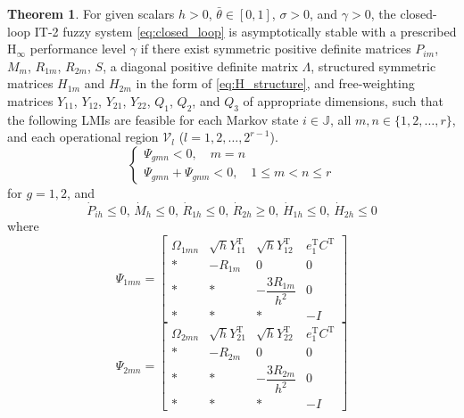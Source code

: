 \documentclass[preprint,review,fleqn,sort&compress,3p]{elsarticle}
\theoremstyle{definition} %
\theoremstyle{definition}%
\newtheorem{thm}{Theorem}[section]
\begin{document}
\begin{thm}\label{thm1}
For given scalars $h>0$, $\bar{\theta}\in[0,1]$, $\sigma>0$, and $\gamma>0$, the closed-loop IT-2 fuzzy system \eqref{eq:closed_loop} is asymptotically stable with a prescribed $\mathrm{H}_\infty$ performance level $\gamma$ if there exist symmetric positive definite matrices
$P_{im}$, $M_m$, $R_{1m}$, $R_{2m}$, $S$, a diagonal positive definite matrix $\Lambda$,
structured symmetric matrices $H_{1m}$ and $H_{2m}$ in the form of \eqref{eq:H_structure},
and free-weighting matrices
$Y_{11}$, $Y_{12}$, $Y_{21}$, $Y_{22}$, $Q_1$, $Q_2$, and $Q_3$
of appropriate dimensions, such that the following LMIs are feasible for each Markov state $i\in\mathbb{J}$, all $m,n\in\{1,2,\ldots,r\}$, and each operational region $\mathcal V_l$ ($l=1,2,\ldots,2^{r-1}$).
\begin{equation}\label{shucr1}
	\begin{cases}
		\Psi_{gmn} < 0 ,\quad  m=n  \\
		\Psi_{gmn} + \Psi_{gnm} < 0,\quad 1 \le m < n \le r
	\end{cases}
\end{equation}
for $g=1,2$, and
\begin{equation}\label{dot_small_0}
	\dot{P}_{ih} \leq 0, \, 
	\dot{M}_{h} \leq 0, \, 
	\dot{R}_{1h} \leq 0, \, 
	\dot{R}_{2h} \geq 0, \, 
	\dot{H}_{1h} \leq 0, \, 
	\dot{H}_{2h} \leq 0
\end{equation}
where
\begin{equation}\label{LMI1}
	\Psi_{1mn} =
	\begin{bmatrix}
		\Omega_{1mn} & \sqrt{h}Y_{11}^{\mathrm{T}} & \sqrt{h}Y_{12}^{\mathrm{T}} & e_1^{\mathrm{T}} C^{\mathrm{T}} \\[1.5ex]
		* & -R_{1m} & 0 & 0  \\[1.5ex]
		* & * & -\dfrac{3R_{1m}}{h^2} & 0 \\[1.5ex]
		* & * & * & -I
	\end{bmatrix}
\end{equation}
\begin{equation}\label{LMI2}
	\Psi_{2mn} =
	\begin{bmatrix}
		\Omega_{2mn} & \sqrt{h}Y_{21}^{\mathrm{T}} & \sqrt{h}Y_{22}^{\mathrm{T}} & e_1^{\mathrm{T}} C^{\mathrm{T}} \\[1.5ex]
		* & -R_{2m} & 0 & 0 \\[1.5ex]
		* & * & -\dfrac{3R_{2m}}{h^2} & 0  \\[1.5ex]
		* & * & * & -I 


\end{bmatrix}
\end{equation}
\end{thm}
\end{document}
